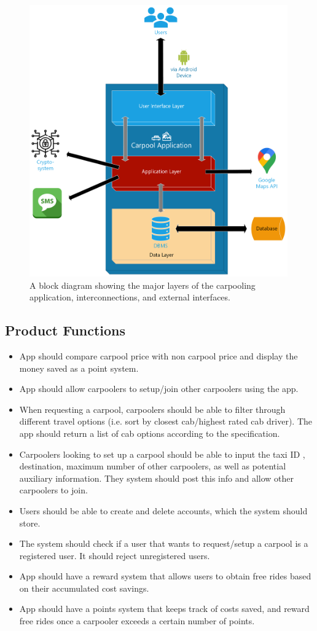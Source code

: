 \documentclass[]{article}
\begin{document}
\begin{figure}[h!]
	\centering
	\includegraphics[width=30em]{../D1/assets/ProductPerspectiveBlockDiagram.png}
	\caption{A block diagram showing the major layers of the carpooling application, interconnections, and external interfaces.}
	\label{fig:blockdiagram}
\end{figure}

\subsection{Product Functions}
\label{sub:product_functions}
\begin{itemize}
	\item App should compare carpool price with non carpool price and display the money saved as a point system.
	\item App should allow carpoolers to setup/join other carpoolers using the app.
	\item When requesting a carpool, carpoolers should be able to filter through different travel options (i.e. sort by closest cab/highest rated cab driver). The app should return a list of cab options according to the specification.
	\item Carpoolers looking to set up a carpool should be able to input the taxi ID , destination, maximum number of other carpoolers, as well as potential auxiliary information. They system should post this info and allow other carpoolers to join.
	\item Users should be able to create and delete accounts, which the system should store.
	\item The system should check if a user that wants to request/setup a carpool is a registered user. It should reject unregistered users.
	\item App should have a reward system that allows users to obtain free rides based on their accumulated cost savings.
	\item App should have a points system that keeps track of costs saved, and reward free rides once a carpooler exceeds a certain number of points.
\end{itemize}
\end{document}

